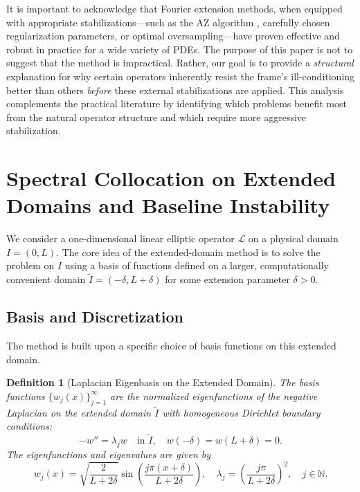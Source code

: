 \documentclass[pdflatex,sn-mathphys-num]{sn-jnl}%
\theoremstyle{thmstyleone}%
\newtheorem{definition}{Definition}
\newcommand{\N}{\mathbb{N}}
\begin{document}
It is important to acknowledge that Fourier extension methods, when equipped with appropriate stabilizations---such as the AZ algorithm \cite{coppe2020az}, carefully chosen regularization parameters, or optimal oversampling---have proven effective and robust in practice for a wide variety of PDEs. The purpose of this paper is not to suggest that the method is impractical. Rather, our goal is to provide a \emph{structural} explanation for why certain operators inherently resist the frame's ill-conditioning better than others \emph{before} these external stabilizations are applied. This analysis complements the practical literature by identifying which problems benefit most from the natural operator structure and which require more aggressive stabilization.

\section{Spectral Collocation on Extended Domains and Baseline Instability}

We consider a one-dimensional linear elliptic operator $\mathcal{L}$ on a physical domain $I = (0, L)$. The core idea of the extended-domain method is to solve the problem on $I$ using a basis of functions defined on a larger, computationally convenient domain $\tilde{I} = (-\delta, L+\delta)$ for some extension parameter $\delta > 0$.

\subsection{Basis and Discretization}

The method is built upon a specific choice of basis functions on this extended domain.

\begin{definition}[Laplacian Eigenbasis on the Extended Domain]
The basis functions $\{w_j(x)\}_{j=1}^\infty$ are the normalized eigenfunctions of the negative Laplacian on the extended domain $\tilde{I}$ with homogeneous Dirichlet boundary conditions:
\begin{equation}
-w'' = \lambda_j w \quad \text{in } \tilde{I}, \quad w(-\delta) = w(L+\delta) = 0.
\end{equation}
The eigenfunctions and eigenvalues are given by
\begin{equation} \label{eq:basis_func}
w_j(x) = \sqrt{\frac{2}{L+2\delta}} \sin\left(\frac{j\pi(x+\delta)}{L+2\delta}\right), \quad \lambda_j = \left(\frac{j\pi}{L+2\delta}\right)^2, \quad j \in \N.
\end{equation}
\end{definition}
\end{document}
